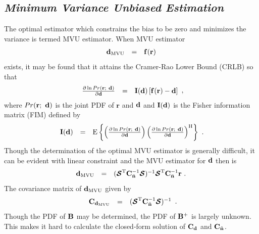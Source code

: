 \documentclass[a4paper,10pt,fleqn, twocolumn]{IEEETran}
\newcommand{\br}{{\mathbf r}}
\newcommand{\bC}{{\bf C}}
\newcommand{\bd}{{\bf d}}
\newcommand{\bn}{{\bf n}}
\newcommand{\bbf}{{\bf d}}
\newcommand{\bI}{{\bf I}}
\newcommand{\bB}{{\bf B}}
\newcommand{\bcS}{{\mbox {\boldmath ${\cal S}$}}}
\begin{document}
\subsection{\em Minimum Variance Unbiased Estimation}
The optimal estimator which constrains the bias to be zero and
minimizes the variance is termed MVU estimator. When MVU estimator
\begin{equation}
\begin{array}{rcl}
{\bd}_{\rm MVU}&=&{\bf f}(\br)
\end{array}
\end{equation}
exists, it may be found that it attains the Cramer-Rao Lower Bound
(CRLB) so that
\begin{equation}
\begin{array}{rcl}
\frac{\partial\ln Pr(\br;\ \bd)}{\partial\bd}&=&\bI(\bd)\left[{\bf
f}(\br)-\bd\right]
\end{array},
\end{equation}
\noindent where $Pr(\br;\ \bd)$ is the joint PDF of $\br$ and
$\bd$ and $\bI(\bd)$ is the Fisher information matrix (FIM)
defined by
\begin{equation}\hspace{-0.04in}
\begin{array}{rcl}
$\bI(\bd)$ &=& {\rm E} \left\{ \left( \frac{\partial \ln{Pr(\br;\
\bd)}}{\partial \bd} \right) \left( \frac{\partial \ln{Pr(\br;\
\bd)}}{\partial \bd} \right)^{\rm H} \right\}
\end{array}.
\end{equation}
\noindent Though the determination of the optimal MVU estimator is
generally difficult, it can be evident with linear constraint and
the MVU estimator for $\bd$ then is~\cite{Key93}
\begin{equation}
\begin{array}{rcl}
{\bbf}_{\rm MVU}&=&(\bcS^{\rm
T}\bC_{\bar{\bn}}^{-1}\bcS)^{-1}\bcS^{\rm
T}\bC_{\bar{\bn}}^{-1}\br\ .
\end{array} \label{BLUE}
\end{equation}
\noindent The covariance matrix of ${\bbf}_{\rm MVU}$ given by
\begin{equation}
\begin{array}{rcl}
{\bC}_{\bd_{\rm MVU}}&=&(\bcS^{\rm
T}\bC_{\bar{\bn}}^{-1}\bcS)^{-1}
\end{array}.
\end{equation}
\noindent Though the PDF of $\bB$ may be determined, the PDF of
$\bB^{+}$ is largely unknown. This makes it hard to calculate the
closed-form solution of $\bC_{\bd}$ and $\bC_{\tilde{\bn}}$.
\end{document}
